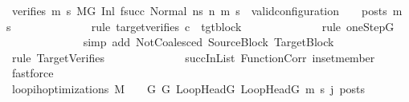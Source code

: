 \begin{isabellebody}
\ verifies{\isacharcolon}{\kern0pt}\ {\isachardoublequoteopen}{\isasymforall}m{}{\isacharprime}{\kern0pt}\ s{}{\isacharprime}{\kern0pt}{\isachardot}{\kern0pt}{\isacharparenleft}{\kern0pt}\ M{\isacharcomma}{\kern0pt}{\isasymLambda}{\isacharcomma}{\kern0pt}{\isasymGamma}{\isacharcomma}{\kern0pt}{\isasymOmega}{\isacharcomma}{\kern0pt}G{\isacharprime}{\kern0pt}\ {\isasymturnstile}{\isacharparenleft}{\kern0pt}Inl\ {\isacharparenleft}{\kern0pt}f{\isacharparenleft}{\kern0pt}succ{\isacharparenright}{\kern0pt}{\isacharparenright}{\kern0pt}{\isacharcomma}{\kern0pt}\ Normal\ ns{\isacharprime}{\kern0pt}{\isacharparenright}{\kern0pt}\ {\isacharminus}{\kern0pt}n{\isasymrightarrow}{\isacharasterisk}{\kern0pt}\ {\isacharparenleft}{\kern0pt}m{}{\isacharprime}{\kern0pt}{\isacharcomma}{\kern0pt}\ s{}{\isacharprime}{\kern0pt}{\isacharparenright}{\kern0pt}{\isacharparenright}{\kern0pt}\ {\isasymlongrightarrow}\ valid{\isacharunderscore}{\kern0pt}configuration\ {\isasymLambda}\ {\isasymGamma}\ {\isasymOmega}\ posts\ m{}{\isacharprime}{\kern0pt}\ s{}{\isacharprime}{\kern0pt}{\isachardoublequoteclose}\isanewline
\ \ \ \ \ \ \ \ \ \ \ \ \isamarkupfalse%
\ {\isacharparenleft}{\kern0pt}rule\ target{\isacharunderscore}{\kern0pt}verifies{\isacharbrackleft}{\kern0pt}\ {\isacharquery}{\kern0pt}c\ {\isacharequal}{\kern0pt}\ tgt{\isacharunderscore}{\kern0pt}block{\isacharbrackright}{\kern0pt}{\isacharparenright}{\kern0pt}\isanewline
\ \ \ \ \ \ \ \ \ \ \ \ \isamarkupfalse%
\ {\isacharparenleft}{\kern0pt}rule\ oneStepG{\isacharparenright}{\kern0pt}\isanewline
\ \ \ \ \ \ \ \ \ \ \ \ \isamarkupfalse%
\ {\isacharparenleft}{\kern0pt}simp\ add{\isacharcolon}{\kern0pt}\ NotCoalesced\ SourceBlock\ TargetBlock{\isacharparenright}{\kern0pt}\isanewline
\ \ \ \ \ \ \ \ \ \ \ \ \isamarkupfalse%
\ {\isacharparenleft}{\kern0pt}rule\ TargetVerifies{\isacharparenright}{\kern0pt}\isanewline
\ \ \ \ \ \ \ \ \ \ \ \ \isamarkupfalse%
\ succInList\ FunctionCorr\ in{\isacharunderscore}{\kern0pt}set{\isacharunderscore}{\kern0pt}member\ \isamarkupfalse%
\ fastforce\isanewline
\isanewline
\ \ \ \ \ \ \ \ \ \ \isamarkupfalse%
\ {\isachardoublequoteopen}loop{\isacharunderscore}{\kern0pt}ih{\isacharunderscore}{\kern0pt}optimizations\ M\ {\isasymLambda}\ {\isasymGamma}\ {\isasymOmega}\ G\ G{\isacharprime}{\kern0pt}\ LoopHeadG\ LoopHeadG{\isacharprime}{\kern0pt}\ m{\isacharprime}{\kern0pt}\ s{\isacharprime}{\kern0pt}\ j\ posts{\isachardoublequoteclose}\isanewline

\end{isabellebody}
